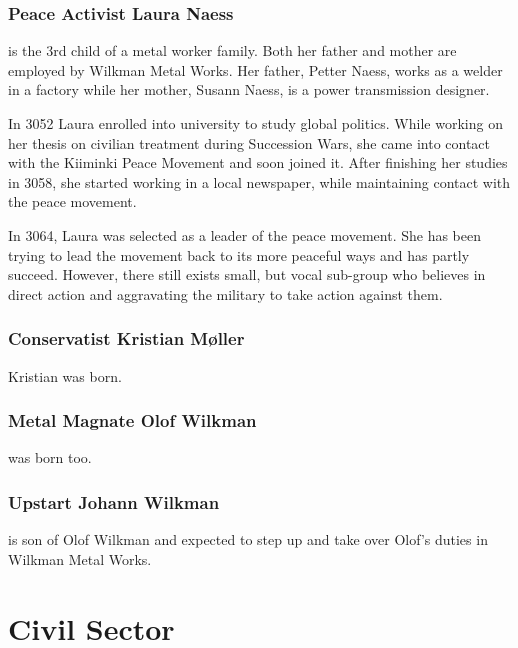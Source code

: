\documentclass{tufte-book}
\begin{document}
\subsection{Peace Activist Laura Naess}
\label{sc:laura-naess}

 is the 3rd child of a metal worker family. Both her
father and mother are employed by Wilkman Metal Works. Her father, Petter
Naess, works as a welder in a factory while her mother, Susann Naess, is a
power transmission designer.

In 3052 Laura enrolled into university to study global politics. While working
on her thesis on civilian treatment during Succession Wars, she came into
contact with the Kiiminki Peace Movement and soon joined it. After finishing
her studies in 3058, she started working in a local newspaper, while
maintaining contact with the peace movement.

In 3064, Laura was selected as a leader of the peace movement. She has been
trying to lead the movement back to its more peaceful ways and has partly
succeed. However, there still exists small, but vocal sub-group who believes
in direct action and aggravating the military to take action against them.

\subsection{Conservatist Kristian M\o ller}
\label{sc:kristian-moller}

Kristian was born.

\subsection{Metal Magnate Olof Wilkman}
\label{sc:bio-olof-wilkman}

 was born too.

\subsection{Upstart Johann Wilkman}
\label{sc:bui.johann-wilkman}

 is son of Olof Wilkman and expected to step up
and take over Olof's duties in Wilkman Metal Works.

\chapter{Civil Sector}
\label{ch:civil-sector}
\end{document}
